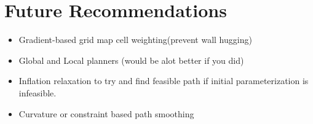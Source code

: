 \section{Future Recommendations}

\begin{itemize}
  \item Gradient-based grid map cell weighting(prevent wall hugging)
  \item Global and Local planners (would be alot better if you did)
  \item Inflation relaxation to try and find feasible path if initial parameterization is infeasible.
  \item Curvature or constraint based path smoothing
\end{itemize}